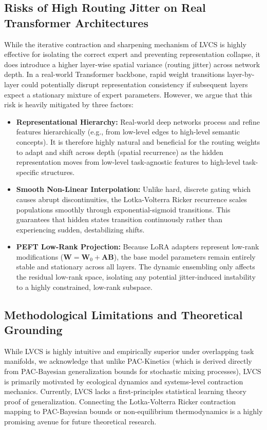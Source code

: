 \subsection{Risks of High Routing Jitter on Real Transformer Architectures}
While the iterative contraction and sharpening mechanism of LVCS is highly effective for isolating the correct expert and preventing representation collapse, it does introduce a higher layer-wise spatial variance (routing jitter) across network depth. In a real-world Transformer backbone, rapid weight transitions layer-by-layer could potentially disrupt representation consistency if subsequent layers expect a stationary mixture of expert parameters.
However, we argue that this risk is heavily mitigated by three factors:
\begin{itemize}
    \item \textbf{Representational Hierarchy:} Real-world deep networks process and refine features hierarchically (e.g., from low-level edges to high-level semantic concepts). It is therefore highly natural and beneficial for the routing weights to adapt and shift across depth (spatial recurrence) as the hidden representation moves from low-level task-agnostic features to high-level task-specific structures.
    \item \textbf{Smooth Non-Linear Interpolation:} Unlike hard, discrete gating which causes abrupt discontinuities, the Lotka-Volterra Ricker recurrence scales populations smoothly through exponential-sigmoid transitions. This guarantees that hidden states transition continuously rather than experiencing sudden, destabilizing shifts.
    \item \textbf{PEFT Low-Rank Projection:} Because LoRA adapters represent low-rank modifications ($\mathbf{W} = \mathbf{W}_0 + \mathbf{A}\mathbf{B}$), the base model parameters remain entirely stable and stationary across all layers. The dynamic ensembling only affects the residual low-rank space, isolating any potential jitter-induced instability to a highly constrained, low-rank subspace.
\end{itemize}

\subsection{Methodological Limitations and Theoretical Grounding}
While LVCS is highly intuitive and empirically superior under overlapping task manifolds, we acknowledge that unlike PAC-Kinetics (which is derived directly from PAC-Bayesian generalization bounds for stochastic mixing processes), LVCS is primarily motivated by ecological dynamics and systems-level contraction mechanics. Currently, LVCS lacks a first-principles statistical learning theory proof of generalization. Connecting the Lotka-Volterra Ricker contraction mapping to PAC-Bayesian bounds or non-equilibrium thermodynamics is a highly promising avenue for future theoretical research.
